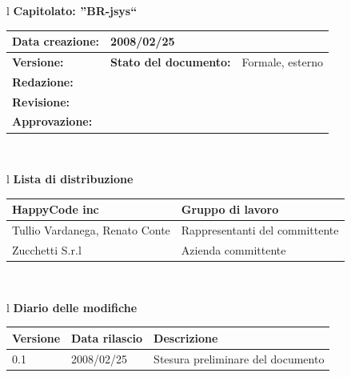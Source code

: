 \documentclass[11pt,titlepage,a4paper]{report}
\begin{document}
\begin{center}
\thispagestyle{plain}
\begin{table}[htbp]
\large{
\begin{tabular}{l}
\Large{\textbf{\textsf{Capitolato: ''BR-jsys``}}} \\
\begin{tabular}{||p{6cm}||p{6cm}||}
\hline
\textbf{Data creazione:} & 2008/02/25 \\ \hline
\textbf{Versione:} & \lv \hline
\textbf{Stato del documento:} & Formale, esterno \\ \hline
\textbf{Redazione:} & \\ \hline
\textbf{Revisione:} & \\ \hline
\textbf{Approvazione:} & \\ \hline
\end{tabular} \\
\end{tabular}
}
\end{table}

\begin{table}[hbtp]
\large{
\begin{tabular}{l}
\Large{\textbf{\textsf{Lista di distribuzione}}} \\

\begin{tabular}{||p{6cm}||p{6cm}||} \hline
{HappyCode inc}& Gruppo di lavoro\\ \hline
{Tullio Vardanega, Renato Conte}& Rappresentanti del committente \\ \hline
{Zucchetti S.r.l}& Azienda committente\\ \hline
\end{tabular} \\
\end{tabular}
}
\end{table}
\begin{table}[hbtp]
\large{
\begin{tabular}{l}
\Large{\textbf{\textsf{Diario delle modifiche}}} \\
\begin{tabular}{||p{2cm}||p{3.5cm}||p{6cm}||} \hline
\textbf{Versione} & \textbf{Data rilascio} & \textbf{Descrizione} \\ \hline
0.1 & 2008/02/25 & Stesura preliminare del documento \\ \hline

\end{tabular} \\
\end{tabular}

}
\end{table}
\end{center}
\newpage
\end{document}

